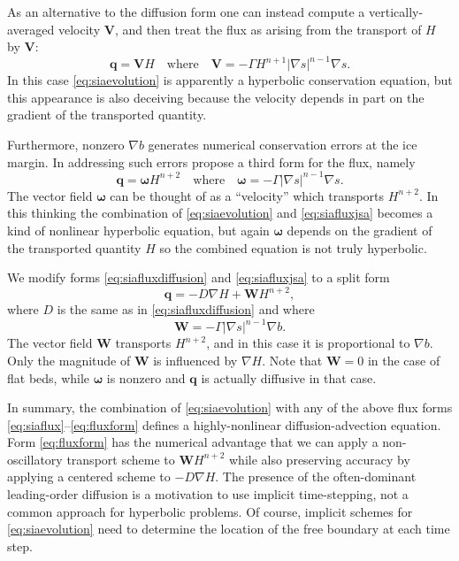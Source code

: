 \documentclass[twocolumn,a4paper]{igs}
\newcommand\bq{\mathbf{q}}
\newcommand\bV{\mathbf{V}}
\newcommand\bW{\mathbf{W}}
\newcommand{\grad}{\nabla}
\begin{document}
As an alternative to the diffusion form one can instead compute a vertically-averaged velocity $\bV$, and then treat the flux as arising from the transport of $H$ by $\bV$:
\begin{equation}
\bq = \bV H \quad \text{where} \quad \bV = - \Gamma H^{n+1} |\grad s|^{n-1} \grad s. \label{eq:siafluxvelocity}
\end{equation}
In this case \eqref{eq:siaevolution} is apparently a hyperbolic conservation equation, but this appearance is also deceiving because the velocity depends in part on the gradient of the transported quantity. 

Furthermore, nonzero $\grad b$ generates numerical conservation errors at the ice margin.  In addressing such errors \cite{JaroschSchoofAnslow2013} propose a third form for the flux, namely
\begin{equation}
   \bq = \boldsymbol{\omega} H^{n+2} \quad \text{where} \quad \boldsymbol{\omega} = - \Gamma |\grad s|^{n-1} \grad s. \label{eq:siafluxjsa}
\end{equation}
The vector field $\boldsymbol{\omega}$ can be thought of as a ``velocity'' which transports $H^{n+2}$.  In this thinking the combination of \eqref{eq:siaevolution} and \eqref{eq:siafluxjsa} becomes a kind of nonlinear hyperbolic equation, but again $\boldsymbol{\omega}$ depends on the gradient of the transported quantity $H$ so the combined equation is not truly hyperbolic.

We modify forms \eqref{eq:siafluxdiffusion} and \eqref{eq:siafluxjsa} to a split form
\begin{equation}
\bq = - D \grad H + \bW H^{n+2},\label{eq:fluxform}
\end{equation}
where $D$ is the same as in \eqref{eq:siafluxdiffusion} and where
\begin{equation}
\bW = - \Gamma |\grad s|^{n-1} \grad b.  \label{eq:siaWdefine}
\end{equation}
The vector field $\bW$ transports $H^{n+2}$, and in this case it is proportional to $\grad b$.  Only the magnitude of $\bW$ is influenced by $\grad H$.  Note that $\bW=0$ in the case of flat beds, while $\boldsymbol{\omega}$ is nonzero and $\bq$ is actually diffusive in that case.

In summary, the combination of \eqref{eq:siaevolution} with any of the above flux forms \eqref{eq:siaflux}--\eqref{eq:fluxform} defines a highly-nonlinear diffusion-advection equation.  Form \eqref{eq:fluxform} has the numerical advantage that we can apply a non-oscillatory transport scheme to $\bW H^{n+2}$ while also preserving accuracy by applying a centered scheme to $-D \grad H$.  The presence of the often-dominant leading-order diffusion is a motivation to use implicit time-stepping, not a common approach for hyperbolic problems.  Of course, implicit schemes for \eqref{eq:siaevolution} need to determine the location of the free boundary at each time step.
\end{document}
